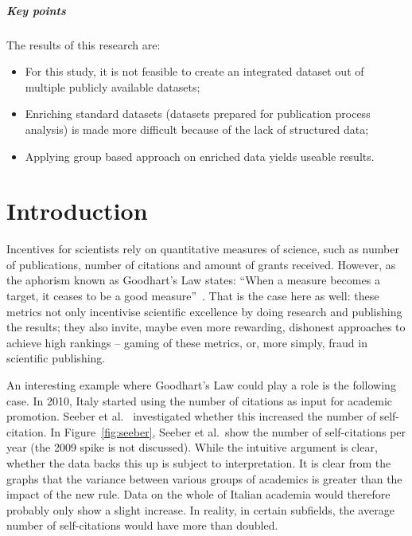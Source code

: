 \documentclass{ou-report}
\newcommand{\outline}[1]{{\color{blue} #1}}
\begin{document}
\paragraph{Key points}
The results of this research are:
\begin{itemize}
    \item For this study, it is not feasible to create an integrated dataset out
    of multiple publicly available datasets;
    \item Enriching standard datasets (datasets prepared for publication process 
    analysis) is made more difficult because of the lack of structured data;
    \item Applying group based approach on enriched data yields useable results.
\end{itemize}


\chapter{Introduction}
Incentives for scientists rely on quantitative measures of science, such as 
number of publications, number of citations and amount of grants received. 
However, as the aphorism known as Goodhart's Law states: ``When a measure 
becomes a target, it ceases to be a good measure''~\cite{strathern_1997}. That 
is the case here as well: these metrics not only incentivise scientific 
excellence by doing research and publishing the results; they also invite, 
maybe even more rewarding, dishonest approaches to achieve high rankings 
-- gaming of these metrics, or, more simply, fraud in scientific publishing. 

An interesting example where Goodhart's Law could play a role is the following
case. In 2010, Italy started using the number of citations as input for academic
promotion. Seeber et al.~\cite{SEEBER2019478} investigated whether this increased
the number of  self-citation. In Figure~\ref{fig:seeber}, Seeber et
al.~show the number of self-citations per year (the 2009 spike is not discussed).
While the intuitive argument is clear, whether the data backs this up is subject
to interpretation. It is clear from the graphs that the variance between various
groups of academics is greater than the impact of the new rule. Data on the whole
of Italian academia would therefore probably only show a slight increase. In
reality, in certain subfields, the average number of self-citations would have more
than doubled.
\end{document}
